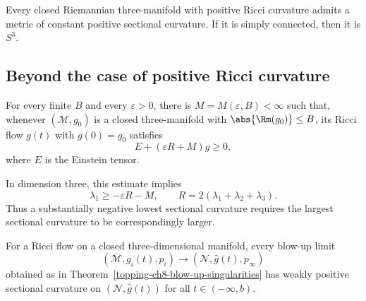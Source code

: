 \begin{corollary}
\label{topping-ch10-space-form-corollary}

Every closed Riemannian three-manifold with positive Ricci curvature admits a
metric of constant positive sectional curvature. If it is simply connected,
then it is $S^3$.
\end{corollary}

\subsection{Beyond the case of positive Ricci curvature}

\begin{theorem}
\label{topping-ch10-hamilton-ivey-theorem}

For every finite $B$ and every $\varepsilon>0$, there is
$M=M(\varepsilon,B)<\infty$ such that, whenever
$(\mathcal{M},g_0)$ is a closed three-manifold with
$\abs{\Rm(g_0)}\leq B$, its Ricci flow $g(t)$ with $g(0)=g_0$ satisfies
\[
E+(\varepsilon R+M)g\geq0,
\]
where $E$ is the Einstein tensor.
\end{theorem}

In dimension three, this estimate implies
\[
\lambda_1\geq-\varepsilon R-M,
\qquad
R=2(\lambda_1+\lambda_2+\lambda_3).
\]
Thus a substantially negative lowest sectional curvature requires the largest
sectional curvature to be correspondingly larger.

\begin{corollary}
\label{topping-ch10-blowup-weakly-positive}

For a Ricci flow on a closed three-dimensional manifold, every blow-up limit
\[
(\mathcal{M},g_i(t),p_i)\longrightarrow(\mathcal{N},\hat g(t),p_\infty)
\]
obtained as in Theorem~\ref{topping-ch8-blow-up-singularities} has weakly positive sectional curvature on
$(\mathcal{N},\hat g(t))$ for all $t\in(-\infty,b)$.
\end{corollary}
